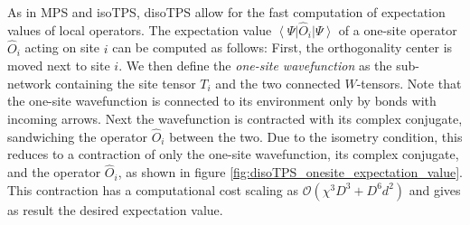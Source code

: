 As in MPS and isoTPS, disoTPS allow for the fast computation of expectation values of local operators. The expectation value $\left\langle\Psi\right|\hat{O}_i\left|\Psi\right\rangle$ of a one-site operator $\hat{O}_i$ acting on site $i$ can be computed as follows: First, the orthogonality center is moved next to site $i$. We then define the \textit{one-site wavefunction} as the sub-network containing the site tensor $T_i$ and the two connected $W$-tensors. Note that the one-site wavefunction is connected to its environment only by bonds with incoming arrows. Next the wavefunction is contracted with its complex conjugate, sandwiching the operator $\hat{O}_i$ between the two. Due to the isometry condition, this reduces to a contraction of only the one-site wavefunction, its complex conjugate, and the operator $\hat{O}_i$, as shown in figure \ref{fig:disoTPS_onesite_expectation_value}. This contraction has a computational cost scaling as $\mathcal{O}\left(\chi^3 D^3 + D^6d^2\right)$ and gives as result the desired expectation value. \par
